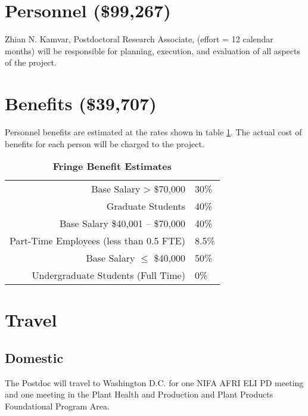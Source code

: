 \documentclass[12pt,letterpaper]{article}
\title{\ruleline{Budget Justification}}
\begin{document}
\maketitle

\section{Personnel (\$99,267)}
Zhian N. Kamvar, Postdoctoral Research Associate, (effort = 12 calendar months) will be responsible for planning, execution, and evaluation of all aspects of the project.

\section{Benefits (\$39,707)}

Personnel benefits are estimated at the rates shown in table \ref{fbe}. 
The actual cost of benefits for each person will be charged to the project. 

\begin{table}[h!]
\centering
\begin{tabular}{rl}
\hline
Base Salary > \$70,000 & 30\% \\
Graduate Students & 40\% \\
Base Salary \$40,001 -- \$70,000 & 40\% \\
Part-Time Employees (less than 0.5 FTE) & 8.5\% \\
Base Salary $\leq$ \$40,000 & 50\% \\
Undergraduate Students (Full Time) & 0\%\\\hline
\end{tabular}
\caption{\label{fbe}\textbf{Fringe Benefit Estimates}}
\end{table}



\section{Travel}
\subsection{Domestic}

The Postdoc will travel to Washington D.C. for one NIFA AFRI ELI PD meeting and one meeting in the Plant Health and Production and Plant Products Foundational Program Area. 
\end{document}
